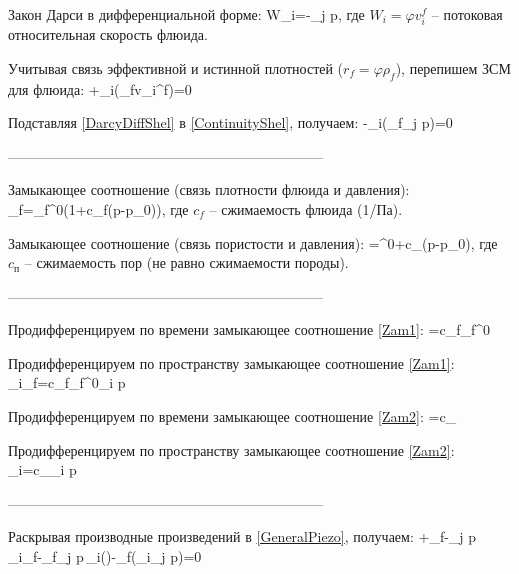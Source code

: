 \documentclass[main.tex]{subfiles}
\begin{document}
Закон Дарси в дифференциальной форме:
\beq\label{DarcyDiffShel}
W_i=-\partial_j p,
\eeq
где $W_i=\varphi v_i^f$ -- потоковая относительная скорость флюида.

Учитывая связь эффективной и истинной плотностей ($r_f=\varphi\rho_f$), перепишем ЗСМ для флюида:
\beq\label{ContinuityShel}
+\partial_i\left(\rho_f\varphi v_i^f\right)=0
\eeq

Подставляя \eqref{DarcyDiffShel} в \eqref{ContinuityShel}, получаем:
\beq\label{GeneralPiezo}
-\partial_i\left(\rho_f\partial_j p\right)=0
\eeq

--------------------------------------------------------------------

Замыкающее соотношение (связь плотности флюида и давления):
\beq\label{Zam1}
\rho_f=\rho_f^0\left(1+c_f\left(p-p_0\right)\right),
\eeq
где $c_f$ -- сжимаемость флюида (1/Па).


Замыкающее соотношение (связь пористости и давления):
\beq\label{Zam2}
\varphi=\varphi^0+c_{}\left(p-p_0\right),
\eeq
где $c_{\text{п}}$ -- сжимаемость пор (не равно сжимаемости породы).

--------------------------------------------------------------------

Продифференцируем по времени замыкающее соотношение \eqref{Zam1}:
\beq\label{DiffZam1}
=c_f\rho_f^0
\eeq

Продифференцируем по пространству замыкающее соотношение \eqref{Zam1}:
\beq\label{GradZam1}
\partial_i\rho_f=c_f\rho_f^0\partial_i p
\eeq

Продифференцируем по времени замыкающее соотношение \eqref{Zam2}:
\beq\label{DiffZam2}
=c_
\eeq

Продифференцируем по пространству замыкающее соотношение \eqref{Zam2}:
\beq\label{GradZam2}
\partial_i\varphi=c_\partial_i p
\eeq

--------------------------------------------------------------------

Раскрывая производные произведений в \eqref{GeneralPiezo}, получаем:
\beq\label{OpenGeneralContinuity}
\varphi+\rho_f-\partial_j p\,\partial_i\rho_f-\rho_f\partial_j p\,\partial_i\!\left(\right)-\rho_f\left(\partial_i\partial_j p\right)=0
\eeq
\end{document}
